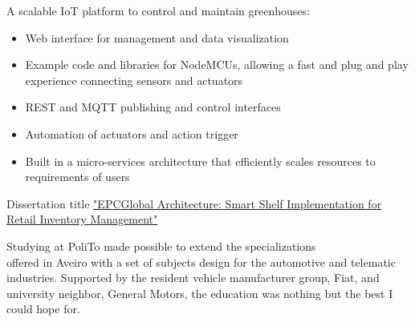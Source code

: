 \documentclass[10pt,a4paper,ragged2e,withhyper]{altacv}
\begin{document}
\begin{paracol}{2}

A scalable IoT platform to control and maintain greenhouses:
\begin{itemize}
\item Web interface for management and data visualization
\item Example code and libraries for NodeMCUs, allowing a fast and plug and play experience connecting sensors and actuators
\item REST and MQTT publishing and control interfaces
\item Automation of actuators and action trigger
\item Built in a micro-services architecture that efficiently scales resources to requirements of users
\end{itemize}

\medskip





Dissertation title \href{https://github.com/dvcorreia/epc-smart-shelve}{"EPCGlobal Architecture: Smart Shelf Implementation for Retail Inventory Management"}
\iffalse
\begin{itemize}
  \item RF survey of industrial shelves for EPC Class1 Gen2 passive tag readings
  \item Optimized RF operations, report contents and tag filtering through the LLRP protocol
  \item Architecture follows the supply-chain specifications in the EPC Global Framework
  \item Used Docker to containerize and orchestrate Fosstrak Java services
  \item Developed HTTP services (REST, websockets) using Golang
  \item Developed a web interface for inventory management with React JS
\end{itemize} 
\fi

\divider


Studying at PoliTo made possible to extend the specializations \\ offered in Aveiro with a set of subjects design for the automotive and telematic industries. Supported by the resident vehicle manufacturer group, Fiat, and university neighbor, General Motors, the education was nothing but the best I could hope for.


\end{paracol}
\end{document}
